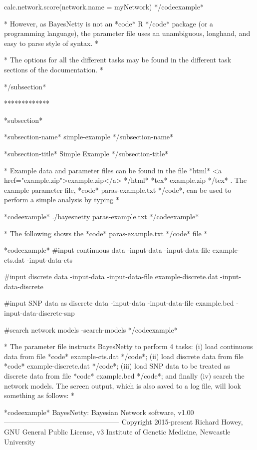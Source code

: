 calc.network.score(network.name = myNetwork) */codeexample*

* However, as BayesNetty is not an *code* R */code* package (or a programming language), the parameter file uses an unambiguous, longhand, and easy to parse style of syntax. *

* The options for all the different tasks may be found in the different task sections of the documentation. *

*/subsection*

*************

*subsection*

*subsection-name* simple-example */subsection-name*

*subsection-title* Simple Example */subsection-title*

* Example data and parameter files can be found in the file *html* <a href="example.zip">example.zip</a> */html* *tex* example.zip */tex* . The example parameter file, *code* paras-example.txt */code*, can be used to perform a simple analysis by typing *

*codeexample*
 ./bayesnetty paras-example.txt
*/codeexample*

* The following shows the *code* paras-example.txt */code* file *

*codeexample* #input continuous data -input-data -input-data-file example-cts.dat -input-data-cts

#input discrete data -input-data -input-data-file example-discrete.dat -input-data-discrete

#input SNP data as discrete data -input-data -input-data-file example.bed -input-data-discrete-snp

#search network models -search-models */codeexample*

* The parameter file instructs BayesNetty to perform 4 tasks: (i) load continuous data from file *code* example-cts.dat */code*; (ii) load discrete data from file *code* example-discrete.dat */code*; (iii) load SNP data to be treated as discrete data from file *code* example.bed */code*; and finally (iv) search the network models. The screen output, which is also saved to a log file, will look something as follows: *

*codeexample* BayesNetty: Bayesian Network software, v1.00 -------------------------------------------------- Copyright 2015-present Richard Howey, GNU General Public License, v3 Institute of Genetic Medicine, Newcastle University

